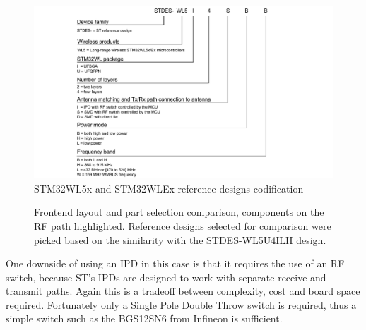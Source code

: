 \begin{figure}
    \includegraphics[width=\textwidth]{fig/STDES-xxxxxxx.png}
    \caption{\label{fig:reference-design-codification} STM32WL5x and STM32WLEx reference designs codification}
\end{figure}

\begin{figure}
    \centering
    \hfil
    \hfil
    \caption{\label{fig:frontend-comparison} Frontend layout and part selection comparison, components on the RF path highlighted. Reference designs selected for comparison were picked based on the similarity with the STDES-WL5U4ILH design.}
\end{figure}

One downside of using an IPD in this case is that it requires the use of an RF switch, because ST's IPDs are designed to work with separate receive and transmit paths. Again this is a tradeoff between complexity, cost and board space required. Fortunately only a Single Pole Double Throw switch is required, thus a simple switch such as the BGS12SN6 from Infineon \cite{infineon_technologies_bgs12sn6_2024} is sufficient.

